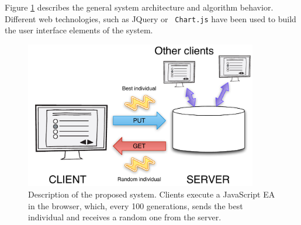 \documentclass[journal,onecolumn]{IEEEtran}
\begin{document}
Figure \ref{fig:system} describes the general system architecture and
algorithm behavior. Different web technologies, such as JQuery or {\tt
  Chart.js} have
been used to build the user interface elements of the system.
\begin{figure}[!t]
\centering
\includegraphics[width=4in]{system.pdf}
\caption{Description of the proposed system. Clients execute a JavaScript EA
  in the browser, which, every 100 generations, sends the best
  individual and receives a random one from the server.}
\label{fig:system}
\end{figure}
\end{document}
